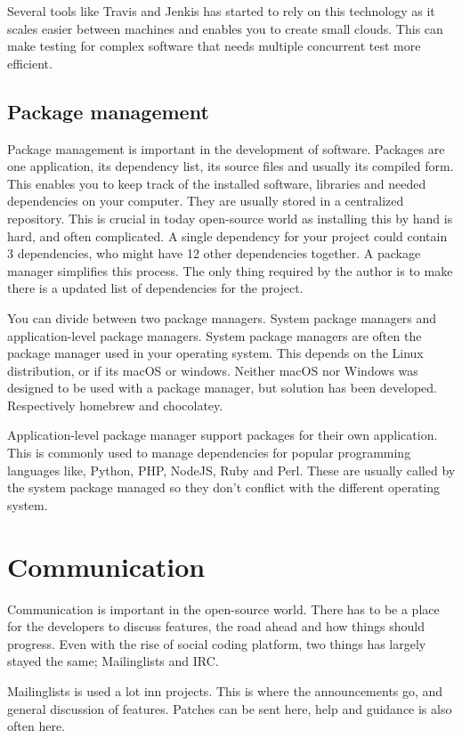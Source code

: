 \documentclass[12pt]{article}
\begin{document}
Several tools like Travis and Jenkis has started to rely on this technology as
it scales easier between machines and enables you to create small clouds. This
can make testing for complex software that needs multiple concurrent test more
efficient.

\subsection{Package management}
Package management is important in the development of
software\cite{packagemanager}. Packages are one application, its dependency
list, its source files and usually its compiled form. This enables you to keep
track of the installed software, libraries and needed dependencies on your
computer. They are usually stored in a centralized repository. This is crucial
in today open-source world as installing this by hand is hard, and often
complicated. A single dependency for your project could contain 3 dependencies,
who might have 12 other dependencies together. A package manager simplifies this
process. The only thing required by the author is to make there is a updated
list of dependencies for the project.

You can divide between two package managers. System package managers and
application-level package managers. System package managers are often the
package manager used in your operating system. This depends on the Linux
distribution, or if its macOS or windows. Neither macOS nor Windows was designed
to be used with a package manager, but solution has been developed. Respectively
homebrew and chocolatey.

Application-level package manager support packages for their own application.
This is commonly used to manage dependencies for popular programming languages
like, Python, PHP, NodeJS, Ruby and Perl. These are usually called by the system
package managed so they don't conflict with the different operating system.

\section{Communication}
Communication is important in the open-source world. There has to be a place for
the developers to discuss features, the road ahead and how things should
progress. Even with the rise of social coding platform, two things has largely
stayed the same; Mailinglists and IRC.

Mailinglists is used a lot inn projects. This is where the announcements go, and
general discussion of features. Patches can be sent here, help and guidance is
also often here.
\end{document}
